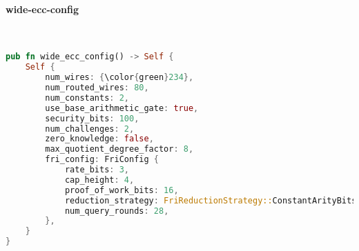 \paragraph{wide-ecc-config}

\hspace*{\fill} \\
\begin{lstlisting}[language=rust]
pub fn wide_ecc_config() -> Self {
    Self {
        num_wires: {\color{green}234},
        num_routed_wires: 80,
        num_constants: 2,
        use_base_arithmetic_gate: true,
        security_bits: 100,
        num_challenges: 2,
        zero_knowledge: false,
        max_quotient_degree_factor: 8,
        fri_config: FriConfig {
            rate_bits: 3,
            cap_height: 4,
            proof_of_work_bits: 16,
            reduction_strategy: FriReductionStrategy::ConstantArityBits(4, 5),
            num_query_rounds: 28,
        },
    }
} 
\end{lstlisting}
